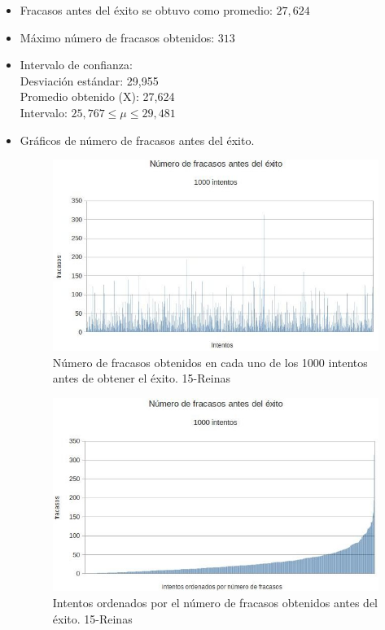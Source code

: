 \documentclass[a4paper,10pt]{article}
\begin{document}
\begin{itemize}
\item Fracasos antes del éxito se obtuvo como promedio: $27,624$
\item Máximo número de fracasos obtenidos: $313$
\item Intervalo de confianza: \\
  Desviación estándar: 29,955 \\
  Promedio obtenido (X): 27,624\\
  Intervalo: $ 25,767  \leq \mu \leq 29,481$ \\

\item Gráficos de número de fracasos antes del éxito.

\begin{figure}
 \centering
 \includegraphics[scale=0.5]{fracasos15.jpg}
 \caption{Número de fracasos obtenidos en cada uno de los 1000 intentos antes de obtener el éxito. 15-Reinas}
 \label{fig:fracasos15}
\end{figure}

\begin{figure}
 \centering
 \includegraphics[scale=0.5]{fracasosOrd15.jpg}
 \caption{Intentos ordenados por el número de fracasos obtenidos antes del éxito. 15-Reinas}
 \label{fig:fracasos15Ord}
\end{figure}


\end{itemize}
\end{document}
